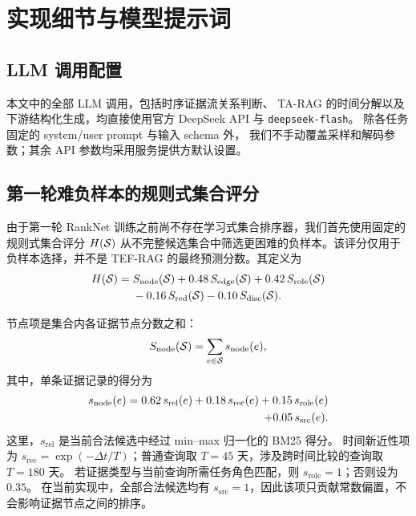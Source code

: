 \section{实现细节与模型提示词}
\label{app:implementation}

\subsection{LLM 调用配置}
\label{app:llm_config}

本文中的全部 LLM 调用，包括时序证据流关系判断、
TA-RAG 的时间分解以及下游结构化生成，均直接使用官方 DeepSeek API 与 \texttt{deepseek-flash}。
除各任务固定的 system/user prompt 与输入 schema 外，
我们不手动覆盖采样和解码参数；其余 API 参数均采用服务提供方默认设置。


\subsection{第一轮难负样本的规则式集合评分}
\label{app:hand_score}

由于第一轮 RankNet 训练之前尚不存在学习式集合排序器，我们首先使用固定的规则式集合评分
$H(\mathcal{S})$ 从不完整候选集合中筛选更困难的负样本。该评分仅用于负样本选择，并不是 TEF-RAG 的最终预测分数。其定义为
\begin{equation}
\begin{aligned}
H(\mathcal{S})
={}&S_{\mathrm{node}}(\mathcal{S})
+0.48\,S_{\mathrm{edge}}(\mathcal{S})
+0.42\,S_{\mathrm{role}}(\mathcal{S})\\
&-0.16\,S_{\mathrm{red}}(\mathcal{S})
-0.10\,S_{\mathrm{disc}}(\mathcal{S}).
\end{aligned}
\label{eq:appendix_hand_score}
\end{equation}

节点项是集合内各证据节点分数之和：
\begin{equation}
S_{\mathrm{node}}(\mathcal{S})
=
\sum_{e\in\mathcal{S}}s_{\mathrm{node}}(e),
\end{equation}
其中，单条证据记录的得分为
\begin{align}
s_{\mathrm{node}}(e)
=
0.62\,s_{\mathrm{rel}}(e)
+0.18\,s_{\mathrm{rec}}(e)
+0.15\,s_{\mathrm{role}}(e) \\
+0.05\,s_{\mathrm{src}}(e). \notag
\end{align}
这里，$s_{\mathrm{rel}}$ 是当前合法候选中经过 min--max 归一化的 BM25 得分。
时间新近性项为 $s_{\mathrm{rec}}=\exp(-\Delta t/T)$；普通查询取 $T=45$ 天，涉及跨时间比较的查询取 $T=180$ 天。
若证据类型与当前查询所需任务角色匹配，则 $s_{\mathrm{role}}=1$；否则设为 $0.35$。
在当前实现中，全部合法候选均有 $s_{\mathrm{src}}=1$，因此该项只贡献常数偏置，不会影响证据节点之间的排序。


